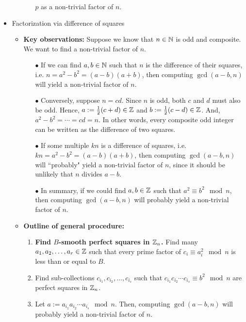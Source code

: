 \begin{itemize}
\begin{itemize}
\begin{itemize}
								$p$ as a non-trivial factor of $n$.
				\end{itemize}
		\end{itemize}
\item	Factorization via difference of squares
		\begin{itemize}
		\item	\textbf{Key observations:}\vskip 0.1cm
				Suppose we know that $n \in \mathbb{N}$ is odd and composite.
				We want to find a non-trivial factor of $n$.
				\begin{itemize}
				\item[$\bullet$]	If we can find $a, b\in\mathbb{N}$ such that $n$ is the difference of their squares,
								i.e. $n = a^{2} - b^{2} = (a-b)(a+b)$,
								then computing $\gcd(a-b,n)$ will yield a non-trivial factor of $n$.
				\item[$\bullet$]	Conversely, suppose $n = cd$.  Since $n$ is odd, both $c$ and $d$
								must also be odd.
								Hence, $a := \frac{1}{2}(c+d) \in \mathbb{Z}$ and $b := \frac{1}{2}(c-d) \in \mathbb{Z}$.
								And, $a^{2} - b^{2} = \cdots = cd = n$.
								In other words, every composite odd integer can be written as the
								difference of two squares.
				\item[$\bullet$]	If some multiple $kn$ is a difference of squares, i.e.
								$kn = a^{2} - b^{2} = (a-b)(a+b)$,
								then computing $\gcd(a-b,n)$ will ``probably" yield a non-trivial factor
								of $n$, since it should be unlikely that $n$ divides $a-b$.
				\item[$\bullet$]	{\color{red}In summary, if we could find $a,b\in\mathbb{Z}$ such that
								$a^{2} \equiv b^{2} \mod n$, then computing $\gcd(a-b,n)$ will
								probably yield a non-trivial factor of $n$.}
				\end{itemize}
		\item	\textbf{Outline of general procedure:}\vskip 0.1cm
				\begin{enumerate}
				\item	\textbf{Find $B$-smooth perfect squares in $\mathbb{Z}_{n}$.}
						Find many $a_{1}, a_{2}, \ldots, a_{r} \in \mathbb{Z}$ such that
						every prime factor of $c_{i} \equiv a_{i}^{2}\mod n$ is less than or equal to $B$.
				\item	Find sub-collections $c_{i_{1}}, c_{i_{2}}, \ldots, c_{i_{s}}$ such that
						$c_{i_{1}} c_{i_{2}} \cdots c_{i_{s}} \equiv b^{2} \mod n$ are
						perfect squares in $\mathbb{Z}_{n}$.
				\item	Let $a := a_{i_{1}} a_{i_{2}} \cdots a_{i_{s}} \mod n$.
						Then, computing $\gcd(a-b,n)$ will probably yield a non-trivial factor of $n$.

\end{enumerate}
\end{itemize}
\end{itemize}
